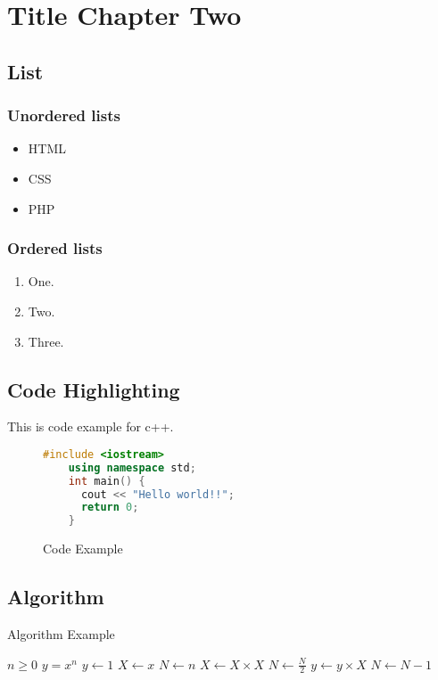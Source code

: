 \chapter{Title Chapter Two}

\section{List}
\subsection{Unordered lists}
\begin{itemize}
  \item HTML
  \item CSS
  \item PHP
\end{itemize}

\subsection{Ordered lists}
\begin{enumerate}
  \item One.
  \item Two.
  \item Three.
\end{enumerate}

\section{Code Highlighting}
This is code example for c++.
\begin{figure}[!h]
  \begin{lstlisting}[language=c++]
    #include <iostream>
    using namespace std;
    int main() {
      cout << "Hello world!!";
      return 0;
    }
    \end{lstlisting}
  \caption{Code Example}
\end{figure}

\section{Algorithm}

\begin{algorithm}
  \caption{Algorithm Example}\label{alg:cap}
  \begin{algorithmic}
    \Require $n \geq 0$
    \Ensure $y = x^n$
    \State $y \gets 1$
    \State $X \gets x$
    \State $N \gets n$
    \State $X \gets X \times X$
    \State $N \gets \frac{N}{2}$  
    \State $y \gets y \times X$
    \State $N \gets N - 1$
    \EndIf
    \EndWhile
  \end{algorithmic}
\end{algorithm}

